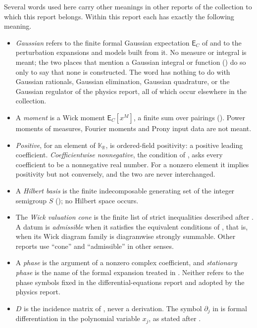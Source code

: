 \documentclass[11pt,letterpaper]{article}
\numberwithin{equation}{section}
\theoremstyle{definition}
\theoremstyle{remark}
\newcommand{\R}{\mathbb R}
\newcommand{\KR}{\mathbb K_{\R}}
\newcommand{\EE}{\mathsf E}
\begin{document}
Several words used here carry other meanings in other reports of the
collection to which this report belongs. Within this report each has exactly
the following meaning.
\begin{itemize}
\item \emph{Gaussian} refers to the finite formal Gaussian expectation
$\EE_C$ of  and to the perturbation expansions and
models built from it. No measure or integral is meant; the two places that
mention a Gaussian integral or function ()
do so only to say that none is constructed. The word has nothing to do with
Gaussian rationals, Gaussian elimination, Gaussian quadrature, or the
Gaussian regulator of the physics report, all of which occur elsewhere in the
collection.
\item A \emph{moment} is a Wick moment $\EE_C[x^M]$, a finite sum over
pairings (). Power moments of measures, Fourier
moments and Prony input data are not meant.
\item \emph{Positive}, for an element of $\KR$, is ordered-field positivity:
a positive leading coefficient. \emph{Coefficientwise nonnegative}, the
condition of , asks every coefficient to be a
nonnegative real number. For a nonzero element it implies positivity but not
conversely, and the two are never interchanged.
\item A \emph{Hilbert basis} is the finite indecomposable generating set of
the integer semigroup $S$ (); no Hilbert space occurs.
\item The \emph{Wick valuation cone} is the finite list of strict
inequalities described after . A datum is
\emph{admissible} when it satisfies the equivalent conditions of
, that is, when its Wick diagram family is diagramwise
strongly summable. Other reports use ``cone'' and ``admissible'' in other
senses.
\item A \emph{phase} is the argument of a nonzero complex coefficient, and
\emph{stationary phase} is the name of the formal expansion treated in
. Neither refers to the phase symbols fixed in the
differential-equations report and adopted by the physics report.
\item $D$ is the incidence matrix of , never a derivation.
The symbol $\partial_j$ in  is formal
differentiation in the polynomial variable $x_j$, as stated after
.
\end{itemize}
\end{document}

